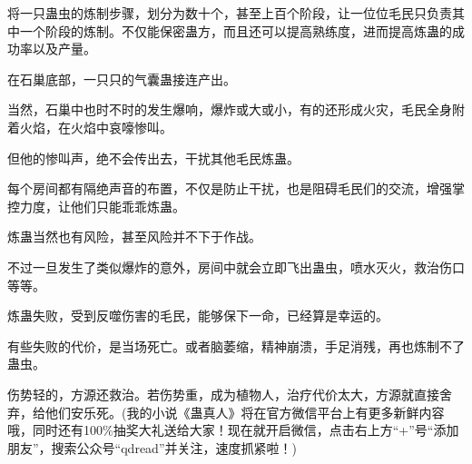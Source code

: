 \begin{this_body}
将一只蛊虫的炼制步骤，划分为数十个，甚至上百个阶段，让一位位毛民只负责其中一个阶段的炼制。不仅能保密蛊方，而且还可以提高熟练度，进而提高炼蛊的成功率以及产量。

在石巢底部，一只只的气囊蛊接连产出。

当然，石巢中也时不时的发生爆响，爆炸或大或小，有的还形成火灾，毛民全身附着火焰，在火焰中哀嚎惨叫。

但他的惨叫声，绝不会传出去，干扰其他毛民炼蛊。

每个房间都有隔绝声音的布置，不仅是防止干扰，也是阻碍毛民们的交流，增强掌控力度，让他们只能乖乖炼蛊。

炼蛊当然也有风险，甚至风险并不下于作战。

不过一旦发生了类似爆炸的意外，房间中就会立即飞出蛊虫，喷水灭火，救治伤口等等。

炼蛊失败，受到反噬伤害的毛民，能够保下一命，已经算是幸运的。

有些失败的代价，是当场死亡。或者脑萎缩，精神崩溃，手足消残，再也炼制不了蛊虫。

伤势轻的，方源还救治。若伤势重，成为植物人，治疗代价太大，方源就直接舍弃，给他们安乐死。(我的小说《蛊真人》将在官方微信平台上有更多新鲜内容哦，同时还有100\%抽奖大礼送给大家！现在就开启微信，点击右上方“+”号“添加朋友”，搜索公众号“qdread”并关注，速度抓紧啦！)

\end{this_body}

